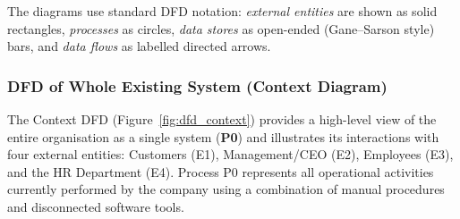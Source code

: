 \documentclass[12pt,a4paper]{report}
\begin{document}
The diagrams use standard DFD notation: \emph{external entities} are shown as solid rectangles, \emph{processes} as circles, \emph{data stores} as open-ended (Gane--Sarson style) bars, and \emph{data flows} as labelled directed arrows.

\subsubsection{DFD of Whole Existing System (Context Diagram)}

The Context DFD (Figure~\ref{fig:dfd_context}) provides a high-level view of the entire organisation as a single system (\textbf{P0}) and illustrates its interactions with four external entities: Customers (E1), Management/CEO (E2), Employees (E3), and the HR Department (E4). Process P0 represents all operational activities currently performed by the company using a combination of manual procedures and disconnected software tools.
\end{document}
